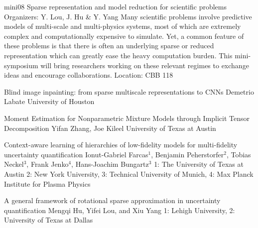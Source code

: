 \mini
{mini08}
{Sparse representation and model reduction for scientific problems}
{Organizers: Y. Lou, J. Hu \& Y. Yang}
{Many scientific problems involve predictive models of multi-scale and multi-physics systems, most of which are extremely complex and computationally expensive to simulate. Yet, a common feature of these problems is that there is often an underlying sparse or reduced representation which can greatly ease the heavy computation burden. This mini-symposium will bring researchers working on these relevant regimes to exchange ideas and encourage collaborations.}
{Location: CBB 118}

\begin{talks}
\item\talk
{Blind image inpainting: from sparse multiscale representations to CNNs}
{Demetrio Labate}
{University of Houston}
\item\talk
{Moment Estimation for Nonparametric Mixture Models through Implicit Tensor Decomposition}
{Yifan Zhang, Joe Kileel}
{University of Texas at Austin}
\item\talk
{Context-aware learning of hierarchies of low-fidelity models for multi-fidelity uncertainty quantification}
{Ionut-Gabriel Farcas$^{1}$, Benjamin Peherstorfer$^{2}$, Tobias Neckel$^{3}$, Frank Jenko$^{4}$, Hans-Joachim Bungartz$^{3}$}
{1: The University of Texas at Austin 2: New York University, 3: Technical University of Munich, 4: Max Planck Institute for Plasma Physics}
\item\talk
{A general framework of rotational sparse approximation in uncertainty quantification}
{Mengqi Hu, Yifei Lou, and Xiu Yang}
{1: Lehigh University, 2: University of Texas at Dallas}
\end{talks}
\room

